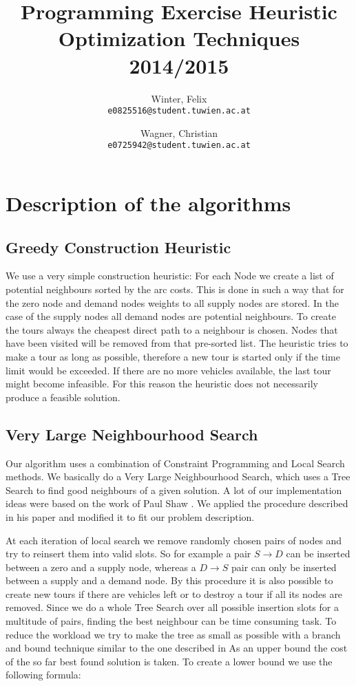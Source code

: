 \documentclass[a4paper]{scrartcl}
\author{
  Winter, Felix\\
  \texttt{e0825516@student.tuwien.ac.at}
  \and
  Wagner, Christian\\
  \texttt{e0725942@student.tuwien.ac.at}
}
\title{Programming Exercise Heuristic Optimization Techniques 2014/2015}
\begin{document}
\setlength{\abovedisplayskip}{0pt}
\setlength{\belowdisplayskip}{0pt}

\begingroup
 \makeatletter
 \maketitle
\endgroup

\section{Description of the algorithms}

\subsection{Greedy Construction Heuristic}

We use a very simple construction heuristic: For each Node we create a list of potential neighbours sorted by the arc costs.
This is done in such a way that for the zero node and demand nodes weights to all supply nodes are stored. In the case of the supply
nodes all demand nodes are potential neighbours.
To create the tours always the cheapest direct path to a neighbour is chosen. Nodes that have been visited will be removed from that
pre-sorted list. The heuristic tries to make a tour as long as possible, therefore a new tour is started only if the time limit would be exceeded.
If there are no more vehicles available, the last tour might become infeasible. For this reason the heuristic does not necessarily
produce a feasible solution.
\subsection{Very Large Neighbourhood Search}

Our algorithm uses a combination of Constraint Programming and Local Search methods. We basically do a Very Large Neighbourhood Search, which uses a Tree Search to find good neighbours of a given solution.
A lot of our implementation ideas were based on the work of Paul Shaw \cite{shaw1998using}. We applied the procedure described in his paper and modified it to fit our problem description.

At each iteration of local search we remove randomly chosen pairs of nodes and try to reinsert them into valid slots. So for example a pair $S \rightarrow D$ can be inserted between a zero and a supply node, whereas a $D \rightarrow S$ pair can only be inserted between a supply and a demand node. By this procedure it is also possible to create new tours if there are vehicles left or to destroy a tour if all its nodes are removed. Since we do a whole Tree Search over all possible insertion slots for a multitude of pairs, finding the best neighbour can be time consuming task. To reduce the workload we try to make the tree as small as possible with a branch and bound technique similar to the one described in \cite{shaw1998using}
As an upper bound the cost of the so far best found solution is taken. To create a lower bound we use the following formula:
\end{document}
